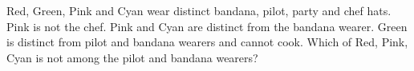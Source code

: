 Red, Green, Pink and Cyan wear distinct bandana, pilot, party and chef hats. Pink is not the chef. Pink and Cyan are distinct from the bandana wearer. Green is distinct from pilot and bandana wearers and cannot cook. Which of Red, Pink, Cyan is not among the pilot and bandana wearers?
